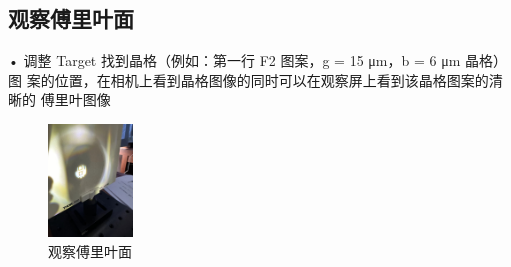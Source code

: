 \documentclass{ctexart}
\begin{document}
\subsection{观察傅里叶面}
• 调整 Target 找到晶格（例如：第一行 F2 图案，g = 15 μm，b = 6 μm 晶格）图
案的位置，在相机上看到晶格图像的同时可以在观察屏上看到该晶格图案的清晰的
傅里叶图像
\begin{figure}[htbp]
  \centering
  \includegraphics[width=0.2\textwidth,height=0.3\textwidth]{pictures/微信图片_20241010201008.jpg}
  \caption{观察傅里叶面} 
\end{figure}
\end{document}
